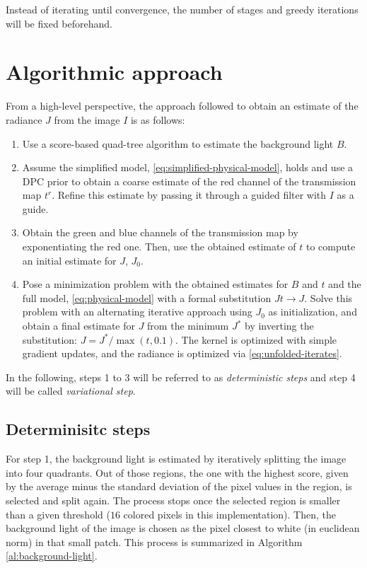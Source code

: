 \documentclass[twocolumn,twoside,a4paper,10pt]{IEEEtran}
\begin{document}
Instead of iterating until convergence, the number of stages and greedy iterations will be fixed beforehand.

\section{Algorithmic approach}

From a high-level perspective, the approach followed to obtain an estimate of the radiance \(J\) from the image \(I\) is as follows:

\begin{enumerate}
  \item Use a score-based quad-tree algorithm to estimate the background light \(B\).
  \item Assume the simplified model, \cref{eq:simplified-physical-model}, holds and use a DPC prior to obtain a coarse estimate of the red channel of the transmission map \(t^r\). Refine this estimate by passing it through a guided filter with \(I\) as a guide.
  \item Obtain the green and blue channels of the transmission map by exponentiating the red one. Then, use the obtained estimate of \(t\) to compute an initial estimate for \(J\), \(J_0\).
  \item Pose a minimization problem with the obtained estimates for \(B\) and \(t\) and the full model, \cref{eq:physical-model} with a formal substitution \(Jt\to J\). Solve this problem with an alternating iterative approach using \(J_0\) as initialization, and obtain a final estimate for \(J\) from the minimum \(J^*\) by inverting the substitution: \(J=J^*/\max(t, 0.1)\). The kernel is optimized with simple gradient updates, and the radiance is optimized via \cref{eq:unfolded-iterates}.
\end{enumerate}
In the following, steps 1 to 3 will be referred to as \textit{deterministic steps} and step 4 will be called \textit{variational step}.

\subsection{Determinisitc steps}
For step 1, the background light is estimated by iteratively splitting the image into four quadrants. Out of those regions, the one with the highest score, given by the average minus the standard deviation of the pixel values in the region, is selected and split again. The process stops once the selected region is smaller than a given threshold (\(16\) colored pixels in this implementation). Then, the background light of the image is chosen as the pixel closest to white (in euclidean norm) in that small patch. This process is summarized in Algorithm \ref{al:background-light}.
\end{document}
